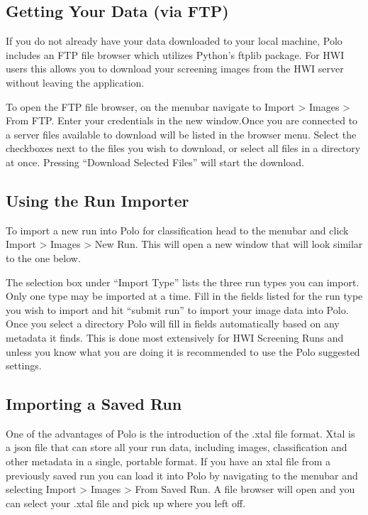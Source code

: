 \documentclass[letterpaper,10pt,english]{sphinxmanual}
\begin{document}
\subsection{Getting Your Data (via FTP)}
\label{\detokenize{user_guide:getting-your-data-via-ftp}}
If you do not already have your data downloaded to your local machine, Polo
includes an FTP file browser which utilizes Python’s ftplib package. For
HWI users this allows you to download your screening images from the
HWI server without leaving the application.

To open the FTP file browser, on the menubar navigate to Import \sphinxhyphen{}\textgreater{} Images
\sphinxhyphen{}\textgreater{} From FTP. Enter your credentials in the new window.Once you are
connected to a server files available to download will be listed in the browser menu.
Select the checkboxes next to the files you wish to download, or select
all files in a directory at once. Pressing “Download Selected Files”
will start the download.


\subsection{Using the Run Importer}
\label{\detokenize{user_guide:using-the-run-importer}}
To import a new run into Polo for classification head to the menubar and
click Import \sphinxhyphen{}\textgreater{} Images \sphinxhyphen{}\textgreater{} New Run. This will open a new window that will
look similar to the one below.

The selection box under “Import Type” lists the three run types you can
import. Only one type may be imported at a time. Fill in the fields listed
for the run type you wish to import and hit “submit run” to import your
image data into Polo. Once you select a directory Polo will fill in fields
automatically based on any metadata it finds. This is done most extensively
for HWI Screening Runs and unless you know what you are doing it is
recommended to use the Polo suggested settings.


\subsection{Importing a Saved Run}
\label{\detokenize{user_guide:importing-a-saved-run}}
One of the advantages of Polo is the introduction of the .xtal file format. Xtal
is a json file that can store all your run data, including images, classification and
other metadata in a single, portable format. If you have an xtal file from a previously
saved run you can load it into Polo by navigating to the menubar and selecting
Import \sphinxhyphen{}\textgreater{} Images \sphinxhyphen{}\textgreater{} From Saved Run. A file browser will open and you can select
your .xtal file and pick up where you left off.
\end{document}
